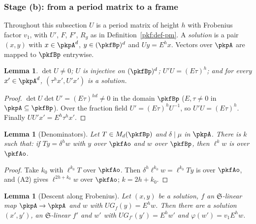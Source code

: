 \documentclass[10pt]{amsart}
\newtheorem{lemma}[theorem]{Lemma}
\theoremstyle{definition}
\theoremstyle{remark}
\begin{document}
\subsubsection{Stage (b): from a period matrix to a frame}\label{pkf:ss-frame}

Throughout this subsection $U$ is a period matrix of height $h$ with Frobenius factor $v_1$, with $U'$,
$F$, $F'$, $R_g$ as in Definition~\ref{pkf:def-pm}. A \emph{solution} is a pair $(x,y)$ with $x\in
\pkpA^d$, $y\in(\pkfBp)^d$ and $Uy=E^hx$. Vectors over $\pkpA$ are mapped to $\pkfBp$ entrywise.

\begin{lemma}\label{pkf:inj}
$\det U\ne0$; $U$ is injective on $(\pkfBp)^d$; $U'U=(E\tau)^h$; and for every $x'\in\pkpA^d$,
$(\tau^hx',U'x')$ is a solution.
\end{lemma}

\begin{proof}
$\det U\det U'=(E\tau)^{hd}\ne0$ in the domain $\pkfBp$ ($E,\tau\ne0$ in $\pkpA\subseteq\pkfBp$). Over the
fraction field $U'=(E\tau)^hU^{-1}$, so $U'U=(E\tau)^h$. Finally $UU'x'=E^h\tau^hx'$.
\end{proof}

\begin{lemma}[Denominators]\label{pkf:denom}
Let $T\in M_d(\pkfBp)$ and $\delta\mid\mu$ in $\pkpA$. There is $k$ such that: if $Ty=\delta^hw$ with $y$ over
$\pkfAo$ and $w$ over $\pkfBp$, then $\ell^kw$ is over $\pkfAo$.
\end{lemma}

\begin{proof}
Take $k_0$ with $\ell^{k_0}T$ over $\pkfAo$. Then $\delta^h\ell^{k_0}w=\ell^{k_0}Ty$ is over $\pkfAo$, and
(A2) gives $\ell^{2h+k_0}w$ over $\pkfAo$; $k=2h+k_0$.
\end{proof}

\begin{lemma}[Descent along Frobenius]\label{pkf:descent}
Let $(x,y)$ be a solution, $f$ an $\mathfrak S$-linear map $\pkpA\to\pkpA$ and $w$ with
$UG_f(y)=E^hw$. Then there are a solution $(x',y')$, an $\mathfrak S$-linear $f'$ and $w'$ with
$UG_{f'}(y')=E^hw'$ and $\varphi(w')=v_1E^hw$.
\end{lemma}
\end{document}
